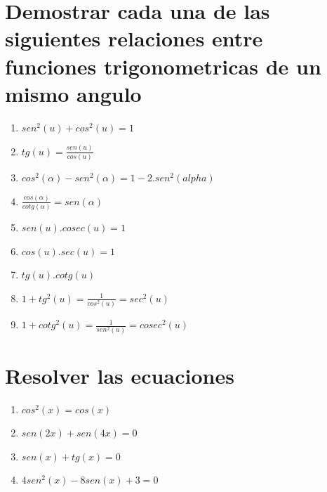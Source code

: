 \documentclass[a4paper,11pt,spanish,sans]{exam}
\begin{document}
\section{Demostrar cada una de las siguientes relaciones entre funciones trigonometricas de un mismo angulo}
\label{demostraciones}

\begin{multicols}{2}%

\begin{enumerate}
\item  $ sen^2(u)+cos^2(u)=1 $

\item  $ tg(u)=\frac{sen(u)}{cos(u)} $

\item $cos^2(\alpha)-sen^2(\alpha)=1-2.sen^2(alpha)$

\item $\frac{cos(\alpha)}{cotg(\alpha)}=sen(\alpha)$

\item  $ sen(u).cosec(u)=1 $

\item  $ cos(u).sec(u)=1 $

\columnbreak 

\item  $ tg(u).cotg(u) $

\item  $ 1+tg^2(u)=\frac{1}{cos^2(u)}=sec^2(u) $

\item  $ 1+cotg^2(u)=\frac{1}{sen^2(u)}=cosec^2(u) $

\end{enumerate}
\end{multicols}

\section{Resolver las ecuaciones}
\label{ecuaciones}

\begin{multicols}{2}%

\begin{enumerate}
\item  $ cos^2(x)=cos(x) $

\item $sen(2x)+sen(4x)=0$

\columnbreak 

\item  $ sen(x)+tg(x)=0 $

\item $4sen^2(x)-8sen(x)+3=0$

\end{enumerate}
\end{multicols}
\end{document}
